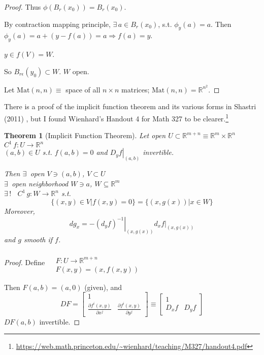 \documentclass[10pt]{amsart}
\newtheorem{theorem}{Theorem}
\begin{document}
\begin{multicols*}{2}
\begin{proof}

Thus $\phi(B_r(x_0)) = B_r(x_0)$.

By contraction mapping principle, $\exists \, a \in B_r(x_0)$, s.t. $\phi_y(a)=a$.  Then $\phi_y(a) = a+ (y-f(a)) = a \Longrightarrow f(a) =y$.  

$y\in f(V) = W$.  

So $B_{r\epsilon}(y_0) \subset W$.  $W$ open.  

Let $\text{Mat}(n,n) \equiv $ space of all $n\times n$ matrices; $\text{Mat}(n,n)  = \mathbb{R}^{n^2}$.  


\end{proof}

There is a proof of the implicit function theorem and its various forms in Shastri (2011) \cite{AShastri2011}, but I found Wienhard's Handout 4 for Math 327 to be clearer.\footnote{\url{https://web.math.princeton.edu/~wienhard/teaching/M327/handout4.pdf}}

\begin{theorem}[Implicit Function Theorem]
Let open $U \subset \mathbb{R}^{m+n} \equiv \mathbb{R}^m \times \mathbb{R}^n$  \\
\phantom{Let} $C^1 \, f:U \to \mathbb{R}^n $ \\
\phantom{Let} $(a,b) \in U$ s.t. $f(a,b) = 0$ and $\left. D_y f\right|_{(a,b)}$ invertible.  

Then $\exists \, $ open $V \ni (a,b)$, $V \subset U$ \\
\phantom{Then} $\exists \, $ open neighborhood $W \ni a$, $W \subseteq \mathbb{R}^m$ \\
\phantom{Then} $\exists \, !$ \, $C^1 \, g:W \to \mathbb{R}^n$ s.t.
\[
\lbrace (x,y) \in V | f(x,y) =0 \rbrace = \lbrace (x,g(x)) | x \in W \rbrace
\]
Moreover,
\[
dg_x = - \left. (d_yf)^{-1} \right|_{(x,g(x))} \left. d_x f\right|_{(x,g(x))}
\]
and $g$ smooth if $f$.  
\end{theorem}

\begin{proof}
  Define $\begin{aligned} & \quad \\
    & F: U \to \mathbb{R}^{m+n}   \\
    & F(x,y) = (x,f(x,y)) \end{aligned}$

Then $F(a,b) = (a,0)$ (given), and 
\[
DF = \left[ \begin{matrix} 1 & \\ 
    \frac{ \partial f^i(x,y)}{ \partial x^j} & \frac{ \partial f^i(x,y) }{ \partial y^j } \end{matrix} \right] \equiv \left[ \begin{matrix} 1 & \\
    D_xf & D_yf \end{matrix} \right]
\]
$DF(a,b)$ invertible.  


\end{proof}
\end{multicols*}
\end{document}
